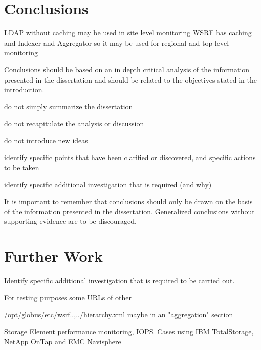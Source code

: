 \section{Conclusions}

LDAP without caching may be used in site level monitoring
WSRF has caching and Indexer and Aggregator so it may be used for regional and top level monitoring


Conclusions should be based on an in depth critical analysis of the information presented in the dissertation and should be related to the objectives stated in the introduction.

do not simply summarize the dissertation

do not recapitulate the analysis or discussion

do not introduce new ideas

identify specific points that have been clarified or discovered, and specific actions to be taken

identify specific additional investigation that is required (and why)

It is important to remember that conclusions should only be drawn on the basis of the information presented in the dissertation. Generalized conclusions without supporting evidence are to be
discouraged.

\section{Further Work}
Identify specific additional investigation that is required to be carried out.

For testing purposes some URLs of other 

/opt/globus/etc/wsrf..,../hierarchy.xml maybe in an "aggregation" section

Storage Element performance monitoring, IOPS. Cases using IBM TotalStorage, NetApp OnTap and EMC Navisphere
